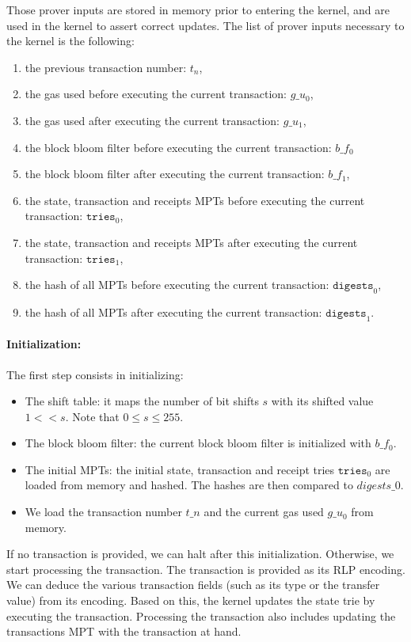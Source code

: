 Those prover inputs are stored in memory prior to entering the kernel, and are used in the kernel to assert correct updates. The list of prover inputs necessary to the kernel is the following:
\begin{enumerate}
    \item the previous transaction number: $t_n$,
    \item the gas used before executing the current transaction: $g\_u_0$,
    \item the gas used after executing the current transaction: $g\_u_1$,
    \item the block bloom filter before executing the current transaction: $b\_f_0$
    \item the block bloom filter after executing the current transaction: $b\_f_1$,
    \item the state, transaction and receipts MPTs before executing the current transaction: $\texttt{tries}_0$,
    \item the state, transaction and receipts MPTs after executing the current transaction: $\texttt{tries}_1$,
    \item the hash of all MPTs before executing the current transaction: $\texttt{digests}_0$,
    \item the hash of all MPTs after executing the current transaction: $\texttt{digests}_1$.
\end{enumerate}

\paragraph*{Initialization:} The first step consists in initializing:
\begin{itemize}
    \item The shift table: it maps the number of bit shifts $s$ with its shifted value $1 << s$. Note that $0 \leq s \leq 255$.
    \item The block bloom filter: the current block bloom filter is initialized with $b\_f_0$.
    \item The initial MPTs: the initial state, transaction and receipt tries $\texttt{tries}_0$ are loaded from memory and hashed. The hashes are then compared to $digests\_0$.
    \item We load the transaction number $t\_n$ and the current gas used $g\_u_0$ from memory.
\end{itemize}

If no transaction is provided, we can halt after this initialization. Otherwise, we start processing the transaction. The transaction is provided as its RLP encoding. We can deduce the various transaction fields (such as its type or the transfer value) from its encoding. Based on this, the kernel updates the state trie by executing the transaction. Processing the transaction also includes updating the transactions MPT with the transaction at hand.


